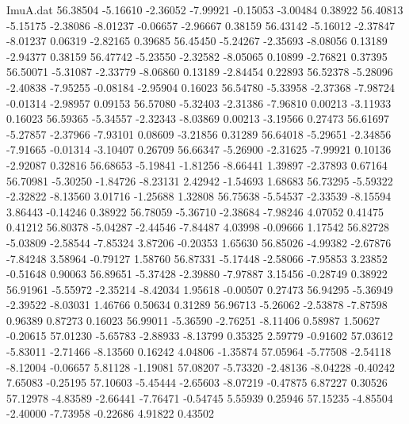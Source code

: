 \begin{filecontents}{ImuA.dat}
  56.38504   -5.16610   -2.36052   -7.99921   -0.15053   -3.00484    0.38922
  56.40813   -5.15175   -2.38086   -8.01237   -0.06657   -2.96667    0.38159
  56.43142   -5.16012   -2.37847   -8.01237    0.06319   -2.82165    0.39685
  56.45450   -5.24267   -2.35693   -8.08056    0.13189   -2.94377    0.38159
  56.47742   -5.23550   -2.32582   -8.05065    0.10899   -2.76821    0.37395
  56.50071   -5.31087   -2.33779   -8.06860    0.13189   -2.84454    0.22893
  56.52378   -5.28096   -2.40838   -7.95255   -0.08184   -2.95904    0.16023
  56.54780   -5.33958   -2.37368   -7.98724   -0.01314   -2.98957    0.09153
  56.57080   -5.32403   -2.31386   -7.96810    0.00213   -3.11933    0.16023
  56.59365   -5.34557   -2.32343   -8.03869    0.00213   -3.19566    0.27473
  56.61697   -5.27857   -2.37966   -7.93101    0.08609   -3.21856    0.31289
  56.64018   -5.29651   -2.34856   -7.91665   -0.01314   -3.10407    0.26709
  56.66347   -5.26900   -2.31625   -7.99921    0.10136   -2.92087    0.32816
  56.68653   -5.19841   -1.81256   -8.66441    1.39897   -2.37893    0.67164
  56.70981   -5.30250   -1.84726   -8.23131    2.42942   -1.54693    1.68683
  56.73295   -5.59322   -2.32822   -8.13560    3.01716   -1.25688    1.32808
  56.75638   -5.54537   -2.33539   -8.15594    3.86443   -0.14246    0.38922
  56.78059   -5.36710   -2.38684   -7.98246    4.07052    0.41475    0.41212
  56.80378   -5.04287   -2.44546   -7.84487    4.03998   -0.09666    1.17542
  56.82728   -5.03809   -2.58544   -7.85324    3.87206   -0.20353    1.65630
  56.85026   -4.99382   -2.67876   -7.84248    3.58964   -0.79127    1.58760
  56.87331   -5.17448   -2.58066   -7.95853    3.23852   -0.51648    0.90063
  56.89651   -5.37428   -2.39880   -7.97887    3.15456   -0.28749    0.38922
  56.91961   -5.55972   -2.35214   -8.42034    1.95618   -0.00507    0.27473
  56.94295   -5.36949   -2.39522   -8.03031    1.46766    0.50634    0.31289
  56.96713   -5.26062   -2.53878   -7.87598    0.96389    0.87273    0.16023
  56.99011   -5.36590   -2.76251   -8.11406    0.58987    1.50627   -0.20615
  57.01230   -5.65783   -2.88933   -8.13799    0.35325    2.59779   -0.91602
  57.03612   -5.83011   -2.71466   -8.13560    0.16242    4.04806   -1.35874
  57.05964   -5.77508   -2.54118   -8.12004   -0.06657    5.81128   -1.19081
  57.08207   -5.73320   -2.48136   -8.04228   -0.40242    7.65083   -0.25195
  57.10603   -5.45444   -2.65603   -8.07219   -0.47875    6.87227    0.30526
  57.12978   -4.83589   -2.66441   -7.76471   -0.54745    5.55939    0.25946
  57.15235   -4.85504   -2.40000   -7.73958   -0.22686    4.91822    0.43502

\end{filecontents}

